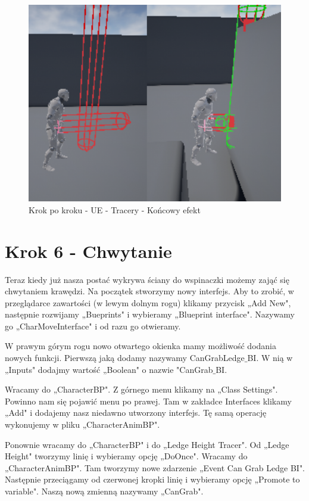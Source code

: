 \documentclass[openright]{xmgr}
\begin{document}
\begin{figure}[!htb]
    \begin{center}
    \includegraphics[scale=0.35]{Screeny/UeKrokPoKroku/spherecollision}
    \end{center}
    \caption{Krok po kroku - UE - Tracery - Końcowy efekt}
\end{figure}

\section{Krok 6 - Chwytanie}

Teraz kiedy już nasza postać wykrywa ściany do wspinaczki możemy zająć się chwytaniem krawędzi. Na początek stworzymy nowy interfejs. Aby to zrobić, w przeglądarce zawartości (w lewym dolnym rogu) klikamy przycisk „Add New", następnie rozwijamy „Bueprints" i wybieramy „Blueprint interface". Nazywamy go „CharMoveInterface" i od razu go otwieramy.

W prawym górym rogu nowo otwartego okienka mamy możliwość dodania nowych funkcji. Pierwszą jaką dodamy nazywamy CanGrabLedge$\_$BI. W nią w „Inputs" dodajmy wartość „Boolean" o nazwie "CanGrab$\_$BI.

Wracamy do „CharacterBP". Z górnego menu klikamy na „Class Settings". Powinno nam się pojawić menu po prawej. Tam w zakładce Interfaces klikamy „Add" i dodajemy nasz niedawno utworzony interfejs. Tę samą operację wykonujemy w pliku „CharacterAnimBP".

Ponownie wracamy do „CharacterBP" i do „Ledge Height Tracer". Od „Ledge Height" tworzymy linię i wybieramy opcję „DoOnce". Wracamy do „CharacterAnimBP". Tam tworzymy nowe zdarzenie „Event Can Grab Ledge BI". Następnie przeciągamy od czerwonej kropki linię i wybieramy opcję „Promote to variable". Naszą nową zmienną nazywamy „CanGrab".
\end{document}
